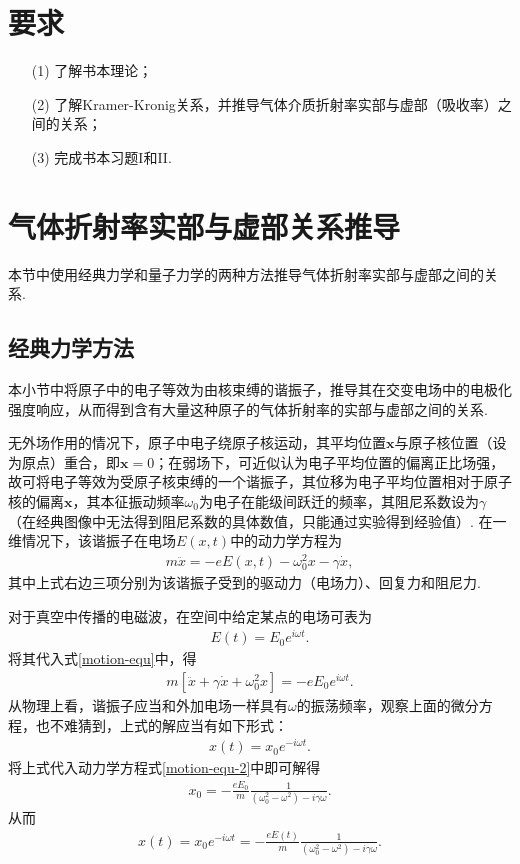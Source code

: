 \documentclass{assignment}
\begin{document}
\section*{要求}
\begin{itemize}
    \item[(1)] 了解书本理论；
    \item[(2)] 了解Kramer-Kronig关系，并推导气体介质折射率实部与虚部（吸收率）之间的关系；
    \item[(3)] 完成书本习题I和II.
\end{itemize}

\section{气体折射率实部与虚部关系推导}
本节中使用经典力学和量子力学的两种方法推导气体折射率实部与虚部之间的关系.

\subsection{经典力学方法}
本小节中将原子中的电子等效为由核束缚的谐振子，推导其在交变电场中的电极化强度响应，从而得到含有大量这种原子的气体折射率的实部与虚部之间的关系.

无外场作用的情况下，原子中电子绕原子核运动，其平均位置$\bm{x}$与原子核位置（设为原点）重合，即$\bm{x}=0$；在弱场下，可近似认为电子平均位置的偏离正比场强，故可将电子等效为受原子核束缚的一个谐振子，其位移为电子平均位置相对于原子核的偏离$\bm{x}$，其本征振动频率$\omega_0$为电子在能级间跃迁的频率，其阻尼系数设为$\gamma$（在经典图像中无法得到阻尼系数的具体数值，只能通过实验得到经验值）. 在一维情况下，该谐振子在电场$E(x,t)$中的动力学方程为
\begin{align}
    \label{motion-equ}
    m\ddot{x}=-eE(x,t)-\omega_0^2x-\gamma\dot{x},
\end{align}
其中上式右边三项分别为该谐振子受到的驱动力（电场力）、回复力和阻尼力.

对于真空中传播的电磁波，在空间中给定某点的电场可表为
\begin{align}
    E(t)=E_0e^{i\omega t}.
\end{align}
将其代入式\eqref{motion-equ}中，得
\begin{align}
    \label{motion-equ-2}
    m[\ddot{x}+\gamma\dot{x}+\omega_0^2x]=-eE_0e^{i\omega t}.
\end{align}
从物理上看，谐振子应当和外加电场一样具有$\omega$的振荡频率，观察上面的微分方程，也不难猜到，上式的解应当有如下形式：
\begin{align}
    \label{trial-sol}
    x(t)=x_0e^{-i\omega t}.
\end{align}
将上式代入动力学方程式\eqref{motion-equ-2}中即可解得
\begin{align}
    x_0=-\frac{eE_0}{m}\frac{1}{(\omega_0^2-\omega^2)-i\gamma\omega}.
\end{align}
从而
\begin{align}
    x(t)=x_0e^{-i\omega t}=-\frac{eE(t)}{m}\frac{1}{(\omega_0^2-\omega^2)-i\gamma\omega}.
\end{align}
\end{document}
